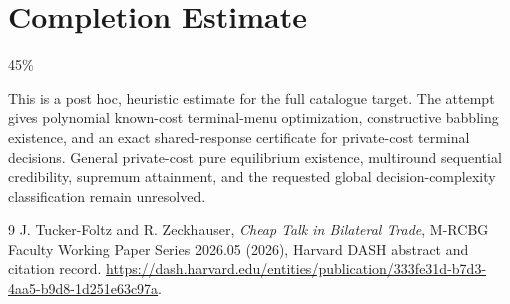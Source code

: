 \documentclass[11pt]{article}
\theoremstyle{remark}
\begin{document}
\section{Completion Estimate}
45\%

This is a post hoc, heuristic estimate for the full catalogue target.
The attempt gives polynomial known-cost terminal-menu optimization, constructive babbling existence, and an exact shared-response certificate for private-cost terminal decisions. General private-cost pure equilibrium existence, multiround sequential credibility, supremum attainment, and the requested global decision-complexity classification remain unresolved.

\begin{thebibliography}{9}
 J. Tucker-Foltz and R. Zeckhauser, \emph{Cheap Talk in Bilateral Trade}, M-RCBG Faculty Working Paper Series 2026.05 (2026), Harvard DASH abstract and citation record. \url{https://dash.harvard.edu/entities/publication/333fe31d-b7d3-4aa5-b9d8-1d251e63c97a}.
\end{thebibliography}
\end{document}
